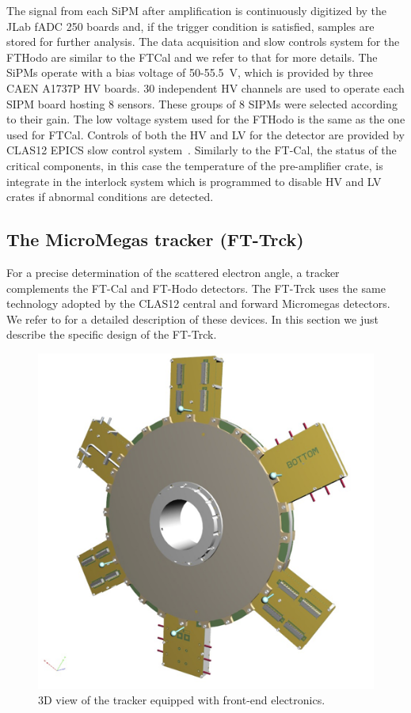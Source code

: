The signal from each SiPM after amplification is continuously digitized by the JLab fADC 250 boards and, if the trigger condition is satisfied, samples are stored for further analysis. The data acquisition and slow controls system for the FTHodo are similar to the FTCal and we refer to that for more details. The SiPMs operate with a bias voltage of 50-55.5~V, which is provided by three CAEN A1737P HV boards. 30 independent HV channels are used to operate each SIPM board hosting 8 sensors. These groups of 8 SIPMs were selected according to their gain. The low voltage system used for the FTHodo is the same as the one used for FTCal. Controls of both the HV and LV for the detector are provided by CLAS12 EPICS slow control system~\cite{daq}. Similarly to the FT-Cal, the status of the critical components, in this case the temperature of the pre-amplifier crate, is integrate in the interlock system which is programmed to disable HV and LV crates if abnormal conditions are detected.


\subsection{The MicroMegas tracker (FT-Trck)}
For a precise determination of the scattered electron angle, a tracker complements the FT-Cal and FT-Hodo detectors. The FT-Trck uses the same technology adopted by the CLAS12 central and forward Micromegas detectors. We refer to \cite{mm} for a detailed description of  these devices. In this section we just describe the specific design of the FT-Trck.
\begin{figure}[th!]
\centering 
\includegraphics[width=1.0\columnwidth]{./fig/fttrk_layout.png}
\caption{3D view of the tracker equipped with front-end electronics.}
\label{fig:ft-trck} 
\end{figure}

